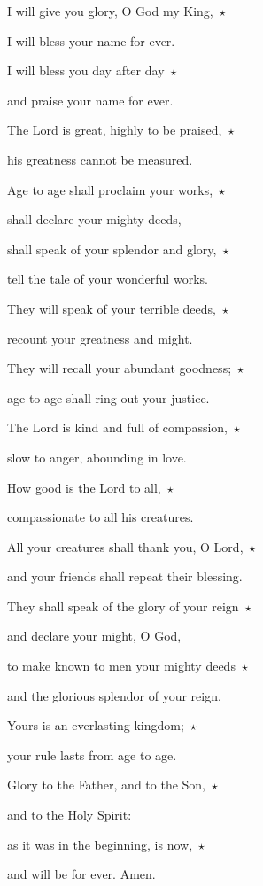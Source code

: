 \noindent I will give you glory, O God my King,~$\star$~\nopagebreak

I will bless your name for ever.

\noindent I will bless you day after day~$\star$~\nopagebreak

and praise your name for ever.

\noindent The Lord is great, highly to be praised,~$\star$~\nopagebreak

his greatness cannot be measured.

\noindent Age to age shall proclaim your works,~$\star$~\nopagebreak

shall declare your mighty deeds,

\noindent shall speak of your splendor and glory,~$\star$~\nopagebreak

tell the tale of your wonderful works.

\noindent They will speak of your terrible deeds,~$\star$~\nopagebreak

recount your greatness and might.

\noindent They will recall your abundant goodness;~$\star$~\nopagebreak

age to age shall ring out your justice.

\noindent The Lord is kind and full of compassion,~$\star$~\nopagebreak

slow to anger, abounding in love.

\noindent How good is the Lord to all,~$\star$~\nopagebreak

compassionate to all his creatures.

\noindent All your creatures shall thank you, O Lord,~$\star$~\nopagebreak

and your friends shall repeat their blessing.

\noindent They shall speak of the glory of your reign~$\star$~\nopagebreak

and declare your might, O God,

\noindent to make known to men your mighty deeds~$\star$~\nopagebreak

and the glorious splendor of your reign.

\noindent Yours is an everlasting kingdom;~$\star$~\nopagebreak

your rule lasts from age to age.

\noindent Glory to the Father, and to the Son,~$\star$~\nopagebreak

and to the Holy Spirit:

\noindent as it was in the beginning, is now,~$\star$~\nopagebreak

and will be for ever. Amen.
